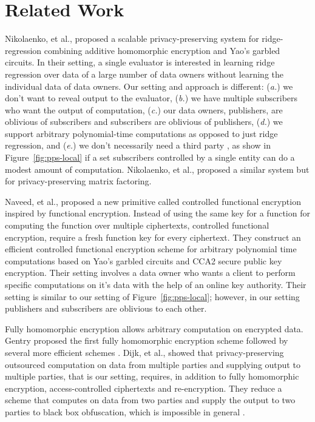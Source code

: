 \section{Related Work}
\label{sec:related}

Nikolaenko, et al., \cite{nikolaenko2013privacy} proposed a scalable
privacy-preserving system for ridge-regression combining additive homomorphic
encryption and Yao's garbled circuits.  In their setting, a single evaluator is
interested in learning ridge regression over data of a large number of data
owners without learning the individual data of data owners. Our setting and
approach is different: (\emph{a.}) we don't want to reveal output to the
evaluator, (\emph{b.}) we have multiple subscribers who want the output of
computation, (\emph{c.}) our data owners, publishers, are oblivious of
subscribers and subscribers are oblivious of publishers, (\emph{d.}) we support
arbitrary polynomial-time computations as opposed to just ridge regression, and
(\emph{e.}) we don't necessarily need a third party \garbler, as show in
Figure~\ref{fig:pps-local} if a set subscribers controlled by a single entity
can do a modest amount of computation. Nikolaenko, et
al.,\cite{nikolaenko2013privacy} proposed a similar system but for
privacy-preserving matrix factoring.

Naveed, et al., \cite{naveed2014controlled} proposed a new primitive called
controlled functional encryption inspired by functional encryption. Instead of
using the same key for a function for computing the function over multiple
ciphertexts, controlled functional encryption, require a fresh function key for
every ciphertext. They construct an efficient controlled functional encryption
scheme for arbitrary polynomial time computations based on Yao's garbled
circuits and CCA2 secure public key encryption. Their setting involves a data
owner who wants a client to perform specific computations on it's data with the
help of an online key authority. Their setting is similar to our setting of
Figure~\ref{fig:pps-local}; however, in our setting publishers and subscribers
are oblivious to each other.

Fully homomorphic encryption allows arbitrary computation on encrypted data.
Gentry proposed the first fully homomorphic encryption
scheme \cite{brakerski2011fully,gentry2009fully} followed by several more
efficient schemes \cite{brakerski2014leveled}. Dijk, et
al., \cite{van2010impossibility} showed that privacy-preserving outsourced
computation on data from multiple parties and supplying output to multiple
parties, that is our setting, requires, in addition to fully homomorphic
encryption, access-controlled ciphertexts and re-encryption. They reduce a
scheme that computes on data from two parties and supply the output to two
parties to black box obfuscation, which is impossible in
general \cite{barak2001possibility}.
